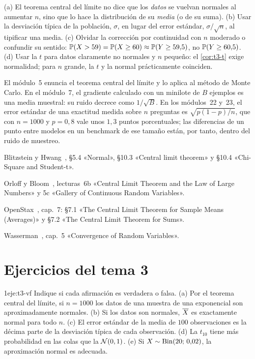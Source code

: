 \begin{observacion}\label{obs:t3-errores}
(a) El teorema central del límite no dice que los \emph{datos} se vuelvan normales al aumentar $n$, sino que lo hace la distribución de su \emph{media} (o de su suma).
(b) Usar la desviación típica de la población, $\sigma$, en lugar del error estándar, $\sigma/\sqrt n$, al tipificar una media.
(c) Olvidar la corrección por continuidad con $n$ moderado o confundir su sentido: $\mathbb{P}(X>59)=\mathbb{P}(X\ge60)\approx\mathbb{P}(Y\ge59{,}5)$, no $\mathbb{P}(Y\ge60{,}5)$.
(d) Usar la $t$ para datos claramente no normales y $n$ pequeño: el \cref{cor:t3-t} exige normalidad; para $n$ grande, la $t$ y la normal prácticamente coinciden.
\end{observacion}

\begin{observacion}
El módulo~5 enuncia el teorema central del límite y lo aplica al método de Monte Carlo. En el módulo~7, el gradiente calculado con un minilote de $B$ ejemplos es una media muestral: su ruido decrece como $1/\sqrt B$. En los módulos~22 y~23, el error estándar de una exactitud medida sobre $n$ preguntas es $\sqrt{p(1-p)/n}$, que con $n=1000$ y $p=0{,}8$ vale unos $1{,}3$ puntos porcentuales; las diferencias de un punto entre modelos en un benchmark de ese tamaño están, por tanto, dentro del ruido de muestreo.
\end{observacion}

\begin{lecturas}
\item Blitzstein y Hwang~\cite{bh}, §5.4 «Normal», §10.3 «Central limit theorem» y §10.4 «Chi-Square and Student-t».
\item Orloff y Bloom~\cite{mit1805}, lecturas~6b «Central Limit Theorem and the Law of Large Numbers» y 5c «Gallery of Continuous Random Variables».
\item OpenStax~\cite{openstax}, cap.~7: §7.1 «The Central Limit Theorem for Sample Means (Averages)» y §7.2 «The Central Limit Theorem for Sums».
\item Wasserman~\cite{wasserman}, cap.~5 «Convergence of Random Variables».
\end{lecturas}

\section*{Ejercicios del tema 3}

\begin{ejercicio}{1}{eje:t3-vf}
Indique si cada afirmación es verdadera o falsa. (a) Por el teorema central del límite, si $n=1000$ los datos de una muestra de una exponencial son aproximadamente normales. (b) Si los datos son normales, $\overline{X}$ es exactamente normal para todo $n$. (c) El error estándar de la media de $100$ observaciones es la décima parte de la desviación típica de cada observación. (d) La $t_{10}$ tiene más probabilidad en las colas que la $\mathcal{N}(0,1)$. (e) Si $X\sim\operatorname{Bin}(20;\,0{,}02)$, la aproximación normal es adecuada.
\end{ejercicio}

